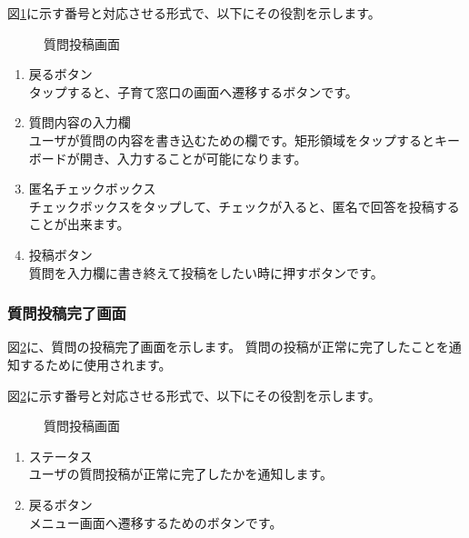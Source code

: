\documentclass[a4j]{jarticle}
\begin{document}
図\ref{honjo_CR_Contribution}に示す番号と対応させる形式で、以下にその役割を示します。

\begin{figure}[H]
    \begin{center}
    \caption {質問投稿画面}
    \label{honjo_CR_Contribution}
    \end{center}
\end{figure}

\begin{enumerate}
  \renewcommand{\labelenumi}{\textcircled{\scriptsize \theenumi}}
  \item 戻るボタン\\
        タップすると、子育て窓口の画面へ遷移するボタンです。
  \item 質問内容の入力欄\\
        ユーザが質問の内容を書き込むための欄です。矩形領域をタップするとキーボードが開き、入力することが可能になります。
  \item 匿名チェックボックス\\
        チェックボックスをタップして、チェックが入ると、匿名で回答を投稿することが出来ます。
  \item 投稿ボタン\\
        質問を入力欄に書き終えて投稿をしたい時に押すボタンです。
\end{enumerate}

\subsubsection{質問投稿完了画面}
図\ref{honjo_CR_CompleteContribution}に、質問の投稿完了画面を示します。
質問の投稿が正常に完了したことを通知するために使用されます。

図\ref{honjo_CR_CompleteContribution}に示す番号と対応させる形式で、以下にその役割を示します。

\begin{figure}[H]
    \begin{center}
    \caption {質問投稿画面}
    \label{honjo_CR_CompleteContribution}
    \end{center}
\end{figure}

\begin{enumerate}
  \renewcommand{\labelenumi}{\textcircled{\scriptsize \theenumi}}
  \item ステータス\\
        ユーザの質問投稿が正常に完了したかを通知します。
  \item 戻るボタン\\
        メニュー画面へ遷移するためのボタンです。
\end{enumerate}
\end{document}
